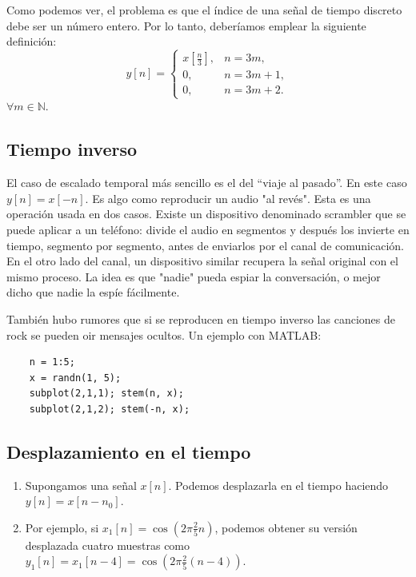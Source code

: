 \documentclass[11pt,a4paper,openany]{book}
\begin{document}
\begin{enumerate}
	Como podemos ver, el problema es que el índice de una señal
	de tiempo discreto debe ser un número entero. Por lo tanto,
	deberíamos emplear la siguiente definición:
	\begin{equation}
		y[n] = 
		\begin{cases}
			x\left[\frac{n}{3}\right], & n = 3m, \\
			0, & n = 3m + 1, \\
			0, & n = 3m + 2.
		\end{cases}
	\end{equation}
	$\forall m \in \mathbb{N}$.
	
\end{enumerate}

\subsection{Tiempo inverso}

El caso de escalado temporal más sencillo es el del ``viaje al
pasado''. En este caso $y[n] = x[-n]$. Es algo como reproducir un audio "al revés".
Esta es una operación usada en dos casos. Existe un dispositivo denominado scrambler que se puede aplicar a un teléfono: divide el audio en segmentos y después los invierte en tiempo, segmento por segmento, antes de enviarlos por el canal de comunicación. En el otro lado del canal, un dispositivo similar recupera la señal original con el mismo proceso. La idea es que "nadie" pueda espiar la conversación, o mejor dicho que nadie la espíe fácilmente.

También hubo rumores que si se reproducen en tiempo inverso las canciones de rock se pueden oir mensajes ocultos. Un ejemplo con MATLAB:
\begin{verbatim}
	n = 1:5;
	x = randn(1, 5);
	subplot(2,1,1); stem(n, x); 
	subplot(2,1,2); stem(-n, x);
\end{verbatim}

\subsection{Desplazamiento en el tiempo}

\begin{enumerate}
	\item Supongamos una señal $x[n]$. Podemos desplazarla en el tiempo
	haciendo $y[n] = x[n - n_{0}]$.
	\item Por ejemplo, si $x_{1}[n] = \cos(2\pi \frac{2}{5} n)$,
	podemos obtener su versión desplazada cuatro muestras como
	$y_{1}[n] = x_{1}[n - 4] = \cos(2\pi \frac{2}{5} (n - 4))$.
\end{enumerate}
\end{document}

